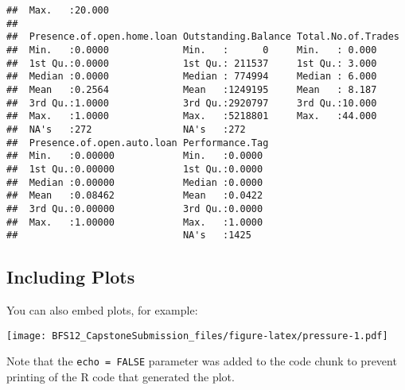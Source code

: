 \documentclass[]{article}
\begin{document}
\begin{verbatim}
##  Max.   :20.000                                                 
##                                                                 
##  Presence.of.open.home.loan Outstanding.Balance Total.No.of.Trades
##  Min.   :0.0000             Min.   :      0     Min.   : 0.000    
##  1st Qu.:0.0000             1st Qu.: 211537     1st Qu.: 3.000    
##  Median :0.0000             Median : 774994     Median : 6.000    
##  Mean   :0.2564             Mean   :1249195     Mean   : 8.187    
##  3rd Qu.:1.0000             3rd Qu.:2920797     3rd Qu.:10.000    
##  Max.   :1.0000             Max.   :5218801     Max.   :44.000    
##  NA's   :272                NA's   :272                           
##  Presence.of.open.auto.loan Performance.Tag 
##  Min.   :0.00000            Min.   :0.0000  
##  1st Qu.:0.00000            1st Qu.:0.0000  
##  Median :0.00000            Median :0.0000  
##  Mean   :0.08462            Mean   :0.0422  
##  3rd Qu.:0.00000            3rd Qu.:0.0000  
##  Max.   :1.00000            Max.   :1.0000  
##                             NA's   :1425
\end{verbatim}

\subsection{Including Plots}\label{including-plots}

You can also embed plots, for example:

\texttt{[image: BFS12\_CapstoneSubmission\_files/figure-latex/pressure-1.pdf]}

Note that the \texttt{echo\ =\ FALSE} parameter was added to the code
chunk to prevent printing of the R code that generated the plot.
\end{document}
